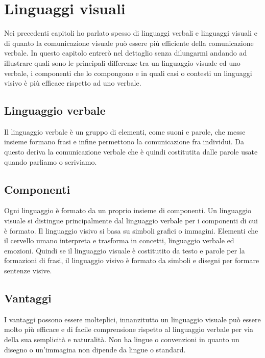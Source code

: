 \chapter{Linguaggi visuali}

    Nei precedenti capitoli ho parlato spesso di linguaggi verbali e linguaggi visuali e di quanto la comunicazione visuale può essere più efficiente della comunicazione verbale. In questo capitolo entrerò nel dettaglio senza dilungarmi andando ad illustrare quali sono le principali differenze tra un linguaggio visuale ed uno verbale, i componenti che lo compongono e in quali casi o contesti un linguaggi visivo è più efficace rispetto ad uno verbale.

    \section{Linguaggio verbale}
    Il linguaggio verbale è un gruppo di elementi, come suoni e parole, che messe insieme formano frasi e infine permettono la comunicazione fra individui. Da questo deriva la comunicazione verbale che è quindi costitutita dalle parole usate quando parliamo o scriviamo.

    \section{Componenti}
    Ogni linguaggio è formato da un proprio insieme di componenti. Un linguaggio visuale si distingue principalmente dal linguaggio verbale per i componenti di cui è formato. Il linguaggio visivo si basa su simboli grafici o immagini. Elementi che il cervello umano interpreta e trasforma in concetti, linguaggio verbale ed emozioni. Quindi se il linguaggio visuale è costitutito da testo e parole per la formazioni di frasi, il linguaggio visivo è formato da simboli e disegni per formare sentenze visive.

    \section{Vantaggi}
    I vantaggi possono essere molteplici, innanzitutto un linguaggio visuale può essere molto più efficace e di facile comprensione rispetto al linguaggio verbale per via della sua semplicità e naturalità. Non ha lingue o convenzioni in quanto un disegno o un'immagina non dipende da lingue o standard.